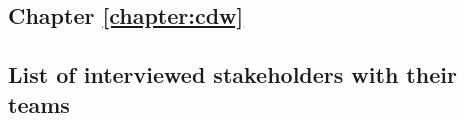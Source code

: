 \documentclass[french,12pt,twoside,a4paper]{book}
\let\fontnumber\relax
\renewcommand{\thesection}{\fontnumber{\color{chaptercolor}\arabic{chapter}.}\arabic{section}}
\renewcommand{\thesubsection}{\fontnumber{\color{chaptercolor}\arabic{chapter}.}\arabic{section}.\arabic{subsection}}
\begin{document}
\clearpage
\begin{appendices}
  \renewcommand{\thechapter}{\Alph{chapter}} %
  \renewcommand{\thesection}{\thechapter.\arabic{section}} %
  \renewcommand{\thesubsection}{\thesection.\arabic{subsection}} %

  \chapter{Chapter \ref{chapter:cdw}}\label{apd:cdw}

  \section{List of interviewed stakeholders with their
    teams}\label{apd:cdw:table:expert_teams}


\end{appendices}
\end{document}
